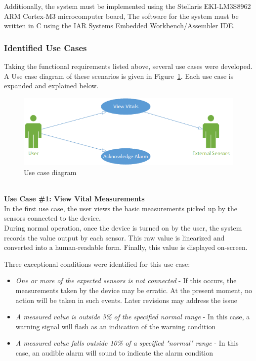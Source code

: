 \documentclass[12pt]{article} %
\begin{document}
Additionally, the system must be implemented using the Stellaris 
EKI-LM3S8962 ARM Cortex-M3 microcomputer board, The software for the system 
must be written in C using the IAR Systems Embedded Workbench/Assembler IDE.

\subsubsection{Identified Use Cases}
Taking the functional requirements listed above, several use cases were
 developed. A Use case diagram of these scenarios is given in Figure~\ref{fig:useCases}. Each use case is expanded and explained below.

\begin{figure}[h]
	\centering
	\includegraphics[width=\textwidth]{../design/use_cases_graphical.png}
	\caption{Use case diagram}
	\label{fig:useCases}
\end{figure}

~\\
\textbf{Use Case \#1: View Vital Measurements } \\
In the first use case, the user views the basic measurements picked up by the
sensors connected to the device. \\
During normal operation, once the device is turned on by the user, the system
records the value output by each sensor. This raw value is linearized and 
converted into a human-readable form. Finally, this value is displayed on-screen.

Three exceptional conditions were identified for this use case: 
\begin{itemize}
  \item \emph{One or more of the expected sensors is not connected} - If this occurs, the measurements taken by the device may be erratic. At the present moment, no action will be taken in such events. Later revisions may address the issue
\item \emph{A measured value is outside 5\% of the specified normal range} - In this case, a warning signal will flash as an indication of the warning condition
\item \emph{A measured value falls outside 10\% of a specified "normal" range} - In this case, an audible alarm will sound to indicate the alarm condition
\end{itemize}
\end{document}
